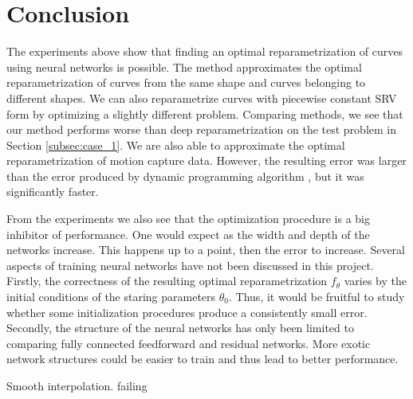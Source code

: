 \section{Conclusion}\label{sec:conclusion}
The experiments above show that finding an optimal reparametrization of curves using neural networks is possible. The method approximates the optimal reparametrization of curves from the same shape and curves belonging to different shapes. We can also reparametrize curves with piecewise constant SRV form by optimizing a slightly different problem. Comparing methods, we see that our method performs worse than deep reparametrization \cite{jørgen2021} on the test problem in Section \ref{subsec:case_1}. We are also able to approximate the optimal reparametrization of motion capture data. However, the resulting error was larger than the error produced by dynamic programming algorithm \cite{bauer2017dp}, but it was significantly faster.

From the experiments we also see that the optimization procedure is a big inhibitor of performance. One would expect as the width and depth of the networks increase. This happens up to a point, then the error to increase. Several aspects of training neural networks have not been discussed in this project. Firstly, the correctness of the resulting optimal reparametrization \(f_\theta\) varies by the initial conditions of the staring parameters \(\theta_0\). Thus, it would be fruitful to study whether some initialization procedures produce a consistently small error. Secondly, the structure of the neural networks has only been limited to comparing fully connected feedforward and residual networks. More exotic network structures could be easier to train and thus lead to better performance.


Smooth interpolation. failing 